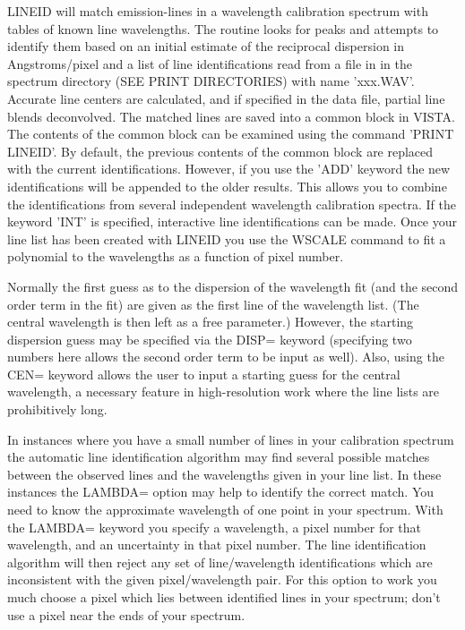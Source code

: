 LINEID will match emission-lines in a wavelength calibration spectrum with
tables of known line wavelengths.  The routine looks for peaks and attempts
to identify them based on an initial estimate of the reciprocal dispersion
in Angstroms/pixel and a list of line identifications read from a file in
in the spectrum directory (SEE PRINT DIRECTORIES) with name 'xxx.WAV'.
Accurate line centers are calculated, and if specified in the data file,
partial line blends deconvolved. The matched lines are saved into a common
block in VISTA.  The contents of the common block can be examined using the
command 'PRINT LINEID'. By default, the previous contents of the common
block are replaced with the current identifications.  However, if you use
the 'ADD' keyword the new identifications will be appended to the older
results. This allows you to combine the identifications from several
independent wavelength calibration spectra. If the keyword 'INT' is
specified, interactive line identifications can be made.  Once your line
list has been created with LINEID you use the WSCALE command to fit a
polynomial to the wavelengths as a function of pixel number.

Normally the first guess as to the dispersion of the wavelength fit (and
the second order term in the fit) are given as the first line of the
wavelength list.  (The central wavelength is then left as a free
parameter.)  However, the starting dispersion guess may be specified via
the DISP= keyword (specifying two numbers here allows the second order term
to be input as well).  Also, using the CEN= keyword allows the user to
input a starting guess for the central wavelength, a necessary feature in
high-resolution work where the line lists are prohibitively long.

In instances where you have a small number of lines in your calibration
spectrum the automatic line identification algorithm may find several
possible matches between the observed lines and the wavelengths given in
your line list.  In these instances the LAMBDA= option may help to identify
the correct match.  You need to know the approximate wavelength of one
point in your spectrum.  With the LAMBDA= keyword you specify a wavelength,
a pixel number for that wavelength, and an uncertainty in that pixel
number.  The line identification algorithm will then reject any set of
line/wavelength identifications which are inconsistent with the given
pixel/wavelength pair.  For this option to work you much choose a pixel
which lies between identified lines in your spectrum; don't use a pixel
near the ends of your spectrum.

